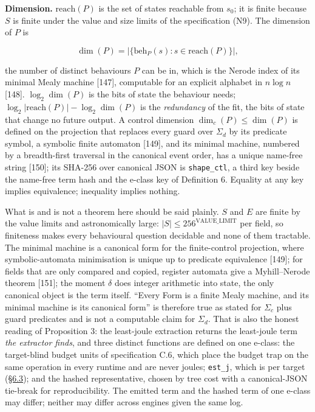 \documentclass[10pt,letterpaper]{article}
\newcounter{none}
\begin{document}
\textbf{Dimension.} \(\mathrm{reach}(P)\) is the set of states reachable
from \(s_0\); it is finite because \(S\) is finite under the value and
size limits of the specification (N9). The dimension of \(P\) is

\[\dim(P) = |\{\mathrm{beh}_P(s) : s \in \mathrm{reach}(P)\}|,\]

the number of distinct behaviours \(P\) can be in, which is the Nerode
index of its minimal Mealy machine {[}147{]}, computable for an explicit
alphabet in \(n \log n\) {[}148{]}. \(\log_2 \dim(P)\) is the bits of
state the behaviour needs;
\(\log_2 |\mathrm{reach}(P)| - \log_2 \dim(P)\) is the \emph{redundancy}
of the fit, the bits of state that change no future output. A control
dimension \(\dim_c(P) \le \dim(P)\) is defined on the projection that
replaces every guard over \(\Sigma_d\) by its predicate symbol, a
symbolic finite automaton {[}149{]}, and its minimal machine, numbered
by a breadth-first traversal in the canonical event order, has a unique
name-free string {[}150{]}; its SHA-256 over canonical JSON is
\texttt{shape\_ctl}, a third key beside the name-free term hash and the
e-class key of Definition 6. Equality at any key implies equivalence;
inequality implies nothing.

What is and is not a theorem here should be said plainly. \(S\) and
\(E\) are finite by the value limits and astronomically large:
\(|S| \le 256^{\mathrm{VALUE\_LIMIT}}\) per field, so finiteness makes
every behavioural question decidable and none of them tractable. The
minimal machine is a canonical form for the finite-control projection,
where symbolic-automata minimisation is unique up to predicate
equivalence {[}149{]}; for fields that are only compared and copied,
register automata give a Myhill--Nerode theorem {[}151{]}; the moment
\(\delta\) does integer arithmetic into state, the only canonical object
is the term itself. ``Every Form is a finite Mealy machine, and its
minimal machine is its canonical form'' is therefore true as stated for
\(\Sigma_c\) plus guard predicates and is not a computable claim for
\(\Sigma_d\). That is also the honest reading of Proposition 3: the
least-joule extraction returns the least-joule term \emph{the extractor
finds}, and three distinct functions are defined on one e-class: the
target-blind budget units of specification C.6, which place the budget
trap on the same operation in every runtime and are never joules;
\texttt{est\_j}, which is per target
(\href{https://research.openie.dev/papers/rce/\#63-energy}{§6.3}); and
the hashed representative, chosen by tree cost with a canonical-JSON
tie-break for reproducibility. The emitted term and the hashed term of
one e-class may differ; neither may differ across engines given the same
log.
\end{document}
